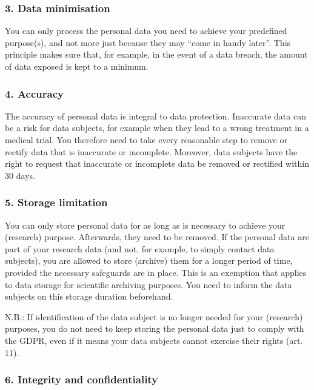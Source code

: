 \documentclass[
]{book}
\begin{document}
\hypertarget{data-minimisation}{%
\subsubsection{3. Data minimisation}\label{data-minimisation}}

You can only process the personal data you need to achieve your predefined purpose(s), and not more just because they may ``come in handy later''. This principle makes sure that, for example, in the event of a data breach, the amount of data exposed is kept to a minimum.

\hypertarget{accuracy}{%
\subsubsection{4. Accuracy}\label{accuracy}}

The accuracy of personal data is integral to data protection. Inaccurate data can be a risk for data subjects, for example when they lead to a wrong treatment in a medical trial. You therefore need to take every reasonable step to remove or rectify data that is inaccurate or incomplete. Moreover, data subjects have the right to request that inaccurate or incomplete data be removed or rectified within 30 days.

\hypertarget{storage-limitation}{%
\subsubsection{5. Storage limitation}\label{storage-limitation}}

You can only store personal data for as long as is necessary to achieve your (research) purpose. Afterwards, they need to be removed. If the personal data are part of your research data (and not, for example, to simply contact data subjects), you are allowed to store (archive) them for a longer period of time, provided the necessary safeguards are in place. This is an exemption that applies to data storage for scientific archiving purposes. You need to inform the data subjects on this storage duration beforehand.

N.B.: If identification of the data subject is no longer needed for your (research) purposes, you do not need to keep storing the personal data just to comply with the GDPR, even if it means your data subjects cannot exercise their rights (art. 11).

\hypertarget{integrity-and-confidentiality}{%
\subsubsection{6. Integrity and confidentiality}\label{integrity-and-confidentiality}}
\end{document}
